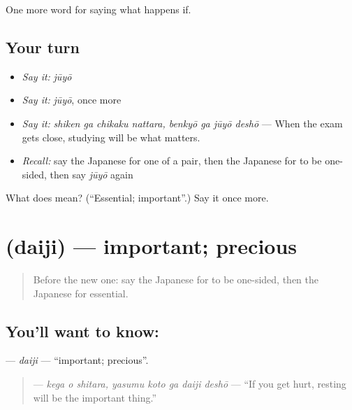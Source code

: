 \begin{grammarlens}[title={What you've built}]
One more word for saying what happens if.
\end{grammarlens}

\subsection*{Your turn}
\begin{itemize}
\raggedright
  \item \emph{Say it:} \emph{jūyō}
  \item \emph{Say it:} \emph{jūyō}, once more
  \item \emph{Say it:} \emph{shiken ga chikaku nattara, benkyō ga jūyō deshō} — When the exam gets close, studying will be what matters.
  \item \emph{Recall:} say the Japanese for one of a pair, then the Japanese for to be one-sided, then say \emph{jūyō} again
\end{itemize}

\begin{tcolorbox}[breakable,colback=teal!4,colframe=teal!35!black,title={Before you move on}]
What does  mean? (\textquotedblleft{}Essential; important\textquotedblright{}.) Say it once more.
\end{tcolorbox}
\section[\texorpdfstring{\ja{だいじ} (daiji)}{だいじ (daiji)}]{ (daiji) — important; precious}

\label{lesson:JA-C369-daiji}



\begin{quote}
Before the new one: say the Japanese for to be one-sided, then the Japanese for essential.
\end{quote}

\subsection*{You'll want to know: }
\textbf{} — \emph{daiji} — \textquotedblleft{}important; precious\textquotedblright{}.

\begin{quote}
\textbf{   } — \emph{kega o shitara, yasumu koto ga daiji deshō} — \textquotedblleft{}If you get hurt, resting will be the important thing.\textquotedblright{}
\end{quote}

